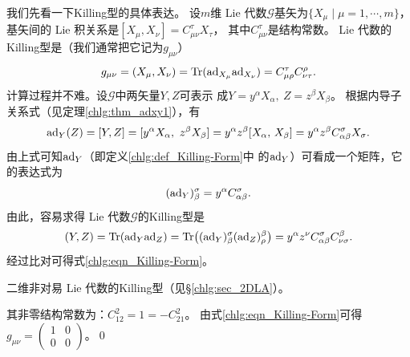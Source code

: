 我们先看一下Killing型的具体表达。
设$m$维 Lie 代数$\mathscr{G}$基矢为$\{X_\mu \mid \mu=1,\cdots,m\}$，
基矢间的 Lie 积关系是$[X_\mu, X_\nu]=C^\tau_{\mu\nu} X_\tau$，
其中$C^\tau_{\mu\nu}$是结构常数。
 Lie 代数的Killing型是（我们通常把它记为$g_{\mu\nu}$）
\begin{equation}\label{chlg:eqn_Killing-Form}
    g_{\mu\nu} = (X_\mu, X_\nu )= {\rm Tr}({\rm ad}_{X_\mu}  {\rm ad}_{X_\nu} )
    = C^\tau_{\mu\rho} C^\rho_{\nu\tau} .
\end{equation}
计算过程并不难。设$\mathscr{G}$中两矢量$Y,Z$可表示
成$Y=y^\alpha X_\alpha,\  Z= z^\beta X_\beta$。
根据内导子关系式（见定理\ref{chlg:thm_adxy1}），有
\begin{equation}
    {\rm ad}_Y(Z)=[Y,Z]=[y^\alpha X_\alpha,\  z^\beta X_\beta]
    = y^\alpha z^\beta[ X_\alpha,\, X_\beta]
    = y^\alpha z^\beta C^\sigma_{\alpha\beta} X_\sigma .
\end{equation}
由上式可知${\rm ad}_Y$（即定义\ref{chlg:def_Killing-Form}中
的${\rm ad}_Y$）可看成一个矩阵，它的表达式为
\begin{equation}
    ({\rm ad}_Y)^\sigma _\beta = y^\alpha C^\sigma_{\alpha\beta} .
\end{equation}
由此，容易求得 Lie 代数$\mathscr{G}$的Killing型是
\begin{equation}
    (Y,Z)={\rm Tr}({\rm ad}_Y  {\rm ad}_Z ) 
    = {\rm Tr}\bigl(({\rm ad}_Y)^\sigma _\beta ({\rm ad}_Z)^\beta _\rho \bigr)
    =  y^\alpha z^\nu C^\sigma_{\alpha\beta}  C^\beta_{\nu\sigma} .
\end{equation}
经过比对可得式\eqref{chlg:eqn_Killing-Form}。

\begin{example}
	二维非对易 Lie 代数的Killing型（见\S\ref{chlg:sec_2DLA}）。
\end{example}

其非零结构常数为：$C^2_{12}=1=-C^2_{21}$。
由式\eqref{chlg:eqn_Killing-Form}可得
$g_{\mu\nu}=\left(\begin{smallmatrix} 1 & 0 \\ 0 & 0\end{smallmatrix}\right)$。\qed


